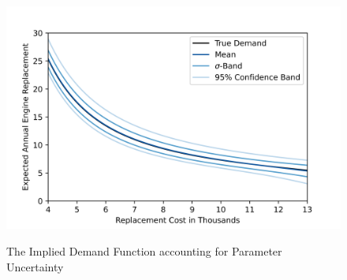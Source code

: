 \begin{figure}[H]
	\caption{The Implied Demand Function accounting for Parameter Uncertainty}
	\vspace*{-4mm}
	\centering
	\includegraphics[scale=0.9]{../figures/figure_4.png}
	\label{figure4}
\end{figure}








